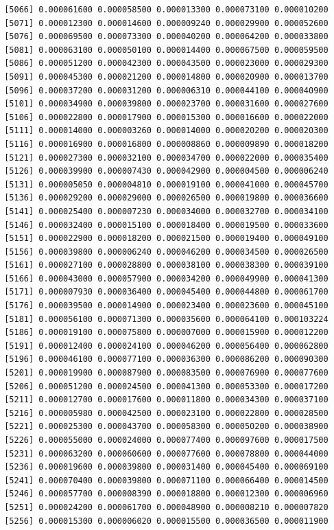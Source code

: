 \documentclass[]{article}
\begin{document}
\begin{verbatim}
 [5066] 0.000061600 0.000058500 0.000013300 0.000073100 0.000010200
 [5071] 0.000012300 0.000014600 0.000009240 0.000029900 0.000052600
 [5076] 0.000069500 0.000073300 0.000040200 0.000064200 0.000033800
 [5081] 0.000063100 0.000050100 0.000014400 0.000067500 0.000059500
 [5086] 0.000051200 0.000042300 0.000043500 0.000023000 0.000029300
 [5091] 0.000045300 0.000021200 0.000014800 0.000020900 0.000013700
 [5096] 0.000037200 0.000031200 0.000006310 0.000044100 0.000040900
 [5101] 0.000034900 0.000039800 0.000023700 0.000031600 0.000027600
 [5106] 0.000022800 0.000017900 0.000015300 0.000016600 0.000022000
 [5111] 0.000014000 0.000003260 0.000014000 0.000020200 0.000020300
 [5116] 0.000016900 0.000016800 0.000008860 0.000009890 0.000018200
 [5121] 0.000027300 0.000032100 0.000034700 0.000022000 0.000035400
 [5126] 0.000039900 0.000007430 0.000042900 0.000004500 0.000006240
 [5131] 0.000005050 0.000004810 0.000019100 0.000041000 0.000045700
 [5136] 0.000029200 0.000029000 0.000026500 0.000019800 0.000036600
 [5141] 0.000025400 0.000007230 0.000034000 0.000032700 0.000034100
 [5146] 0.000032400 0.000015100 0.000018400 0.000019500 0.000033600
 [5151] 0.000022900 0.000018200 0.000021500 0.000019400 0.000049100
 [5156] 0.000039800 0.000006240 0.000046200 0.000034500 0.000026500
 [5161] 0.000027100 0.000028800 0.000038100 0.000038300 0.000039100
 [5166] 0.000043000 0.000057900 0.000034200 0.000049900 0.000041300
 [5171] 0.000007930 0.000036400 0.000045400 0.000044800 0.000061700
 [5176] 0.000039500 0.000014900 0.000023400 0.000023600 0.000045100
 [5181] 0.000056100 0.000071300 0.000035600 0.000064100 0.000103224
 [5186] 0.000019100 0.000075800 0.000007000 0.000015900 0.000012200
 [5191] 0.000012400 0.000024100 0.000046200 0.000056400 0.000062800
 [5196] 0.000046100 0.000077100 0.000036300 0.000086200 0.000090300
 [5201] 0.000019900 0.000087900 0.000083500 0.000076900 0.000077600
 [5206] 0.000051200 0.000024500 0.000041300 0.000053300 0.000017200
 [5211] 0.000012700 0.000017600 0.000011800 0.000034300 0.000037100
 [5216] 0.000005980 0.000042500 0.000023100 0.000022800 0.000028500
 [5221] 0.000025300 0.000043700 0.000058300 0.000050200 0.000038900
 [5226] 0.000055000 0.000024000 0.000077400 0.000097600 0.000017500
 [5231] 0.000063200 0.000060600 0.000077600 0.000078800 0.000044000
 [5236] 0.000019600 0.000039800 0.000031400 0.000045400 0.000069100
 [5241] 0.000070400 0.000039800 0.000071100 0.000066400 0.000014500
 [5246] 0.000057700 0.000008390 0.000018800 0.000012300 0.000006960
 [5251] 0.000024200 0.000061700 0.000048900 0.000008210 0.000007820
 [5256] 0.000015300 0.000006020 0.000015500 0.000036500 0.000011900

\end{verbatim}
\end{document}
